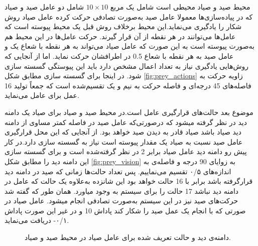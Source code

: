محیط صید و صیاد محیطی است شامل یک مربع $10\times 10$ شامل دو عامل صید و صیاد که در پیاده‌سازی‌ها معمولا عامل صید به‌صورت تصادفی حرکت کرده عامل صیاد روش شکار را یادگیری می‌نماید.این محیط برخلاف روش قبل یک محیط پیوسته است که عامل‌ها می‌توانند در هر نقطه از آن قرار گیرند. حرکت عامل‌ها در این محیط هم به‌صورت پیوسته است به این صورت که عامل صیاد می‌تواند به هر نقطه با شعاع یک و عامل صید به هر نقطه با شعاع 0.5 در اطرافشان حرکت نماید. اما از آنجایی که روش‌هایی یادگیری نیاز به تعداد اعمال مشخص دارد باید این پیوستگی گسسته سازی شود. در اینجا برای گسسته سازی مطابق شکل \ref{fig:prey_actions} زاویه حرکت به فاصله‌های 45 درجه‌ای و فاصله حرکت به نیم و یک تقسیم‌شده است که جمعاً تولید 16 عمل برای عامل می‌نماید.

موضوع بعد حالت‌های قرارگیری عامل است.در محیط صید و صیاد برای صیاد یک دامنه دید در نظر گرفته میشود که درصورتی‌که عامل صید در فاصله کمتر مساوی از دامنه دید صیاد باشد صیاد قادر به دیدن صید خواهد بود. از آنجایی که این محل  قرارگیری عامل صید نسبت به صیاد یک مقدار پیوسته است نیاز به گسسته سازی دارد.در کار پیش رو دامنه دید عامل صیاد برابر 2 در نظر گرفته‌شده است و برای گسسته سازی این دامنه دید را مطابق شکل \ref{fig:prey_vision} به زوایای 90 درجه و فاصله‌ی به ‌اندازه‌های ۰/۵ تقسیم می‌نماییم. پس تعداد حالت‌ها زمانی که صید در دامنه دید قرارگرفته باشد برابر با 16 حالت خواهد بود این شانزده به‌علاوه یک حالت که عامل در دامنه دید نباشد 17 حالت را برای سیستم به وجود میاورد. همان طور که گفته شد حرکت‌های صید نیز در این سیستم به‌صورت تصادفی انجام میشود. عامل صیاد در صورتی که با انجام یک عمل صید را شکار کند پاداش 10 و در غیر این صورت پاداش  ۰/۱- دریافت می‌نماید.

\begin{figure}
\centering
{}
\caption{دامنه‌ی دید و حالت تعریف شده برای عامل صیاد در محیط صید و صیاد.}
\label{fig:prey_actions_vision}
\end{figure}
